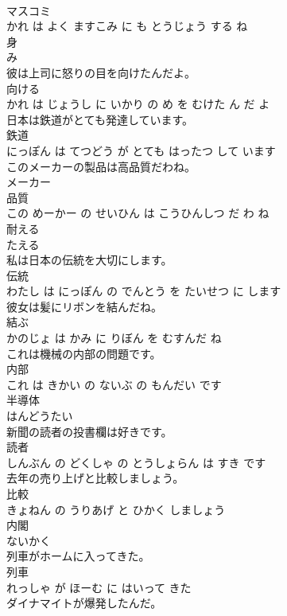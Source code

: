 \documentclass[8pt]{extreport}
\begin{document}
\begin{CJK}{UTF8}{min}
\\	マスコミ 
\\	かれ は よく ますこみ に も とうじょう する ね			
\\	身	
\\	み			
\\	彼は上司に怒りの目を向けたんだよ。	
\\	向ける 
\\	かれ は じょうし に いかり の め を むけた ん だ よ			
\\	日本は鉄道がとても発達しています。	
\\	鉄道 
\\	にっぽん は てつどう が とても はったつ して います			
\\	このメーカーの製品は高品質だわね。	
\\	メーカー 
\\	品質 
\\	この めーかー の せいひん は こうひんしつ だ わ ね			
\\	耐える	
\\	たえる			
\\	私は日本の伝統を大切にします。	
\\	伝統 
\\	わたし は にっぽん の でんとう を たいせつ に します			
\\	彼女は髪にリボンを結んだね。	
\\	結ぶ 
\\	かのじょ は かみ に りぼん を むすんだ ね			
\\	これは機械の内部の問題です。	
\\	内部 
\\	これ は きかい の ないぶ の もんだい です			
\\	半導体	
\\	はんどうたい			
\\	新聞の読者の投書欄は好きです。	
\\	読者 
\\	しんぶん の どくしゃ の とうしょらん は すき です			
\\	去年の売り上げと比較しましょう。	
\\	比較 
\\	きょねん の うりあげ と ひかく しましょう			
\\	内閣	
\\	ないかく			
\\	列車がホームに入ってきた。	
\\	列車 
\\	れっしゃ が ほーむ に はいって きた			
\\	ダイナマイトが爆発したんだ。	

\end{CJK}
\end{document}
